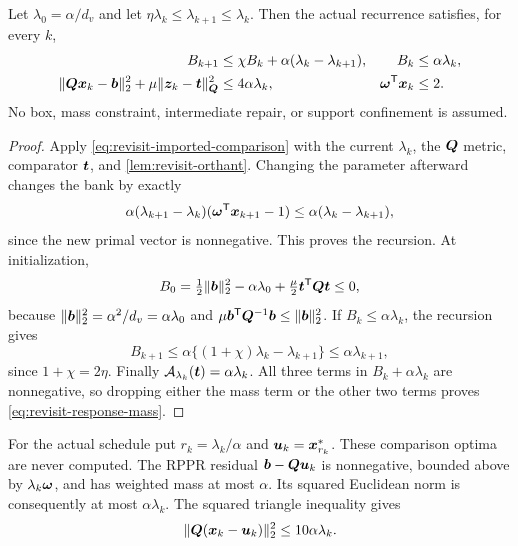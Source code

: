 \begin{theorem}
\label{thm:revisit-cooling-bank}
Let $\lambda_0=\alpha/d_v$ and let
$\eta\lambda_k\leq\lambda_{k+1}\leq\lambda_k$. Then the actual recurrence
satisfies, for every $k$,
\begin{align}
 B_{k+1}&\leq\chi B_k+\alpha(\lambda_k-\lambda_{k+1}),
                 &B_k&\leq\alpha\lambda_k,
                 \label{eq:revisit-cooling-bank}\\
 \|\bm{Q}\bm{x}_k-\bm{b}\|_2^2
   +\mu\|\bm{z}_k-\bm{t}\|_{\bm{Q}}^2&\leq4\alpha\lambda_k,
                 &\bm{\omega}^{\mathsf{T}}\bm{x}_k&\leq2.
                 \label{eq:revisit-response-mass}
\end{align}
No box, mass constraint, intermediate repair, or support confinement is
assumed.
\end{theorem}
\begin{proof}
Apply \cref{eq:revisit-imported-comparison} with the current $\lambda_k$,
the $\bm{Q}$ metric, comparator $\bm{t}$, and
\cref{lem:revisit-orthant}. Changing the parameter afterward changes the
bank by exactly
\[
 \alpha(\lambda_{k+1}-\lambda_k)
                     (\bm{\omega}^{\mathsf{T}}\bm{x}_{k+1}-1)
 \leq\alpha(\lambda_k-\lambda_{k+1}),
\]
since the new primal vector is nonnegative. This proves the recursion.
At initialization,
\[
 B_0=\tfrac12\|\bm{b}\|_2^2-\alpha\lambda_0
                                  +\tfrac\mu2\bm{t}^{\mathsf{T}}\bm{Q}\bm{t}\leq0,
\]
because $\|\bm{b}\|_2^2=\alpha^2/d_v=\alpha\lambda_0$ and
$\mu\bm{b}^{\mathsf{T}}\bm{Q}^{-1}\bm{b}\leq\|\bm{b}\|_2^2$.
If $B_k\leq\alpha\lambda_k$, the recursion gives
\[
 B_{k+1}\leq\alpha\{(1+\chi)\lambda_k-\lambda_{k+1}\}
              \leq\alpha\lambda_{k+1},
\]
since $1+\chi=2\eta$. Finally
$\mathcal A_{\lambda_k}(\bm{t})=\alpha\lambda_k$.
All three terms in $B_k+\alpha\lambda_k$ are nonnegative, so dropping
either the mass term or the other two terms proves
\cref{eq:revisit-response-mass}.
\end{proof}

For the actual schedule put $r_k=\lambda_k/\alpha$ and
$\bm{u}_k=\bm{x}_{r_k}^*$. These comparison optima are never computed.
The RPPR residual $\bm{b}-\bm{Q}\bm{u}_k$ is nonnegative, bounded above by
$\lambda_k\bm{\omega}$, and has weighted mass at most $\alpha$.
Its squared Euclidean norm is consequently at most $\alpha\lambda_k$.
The squared triangle inequality gives
\begin{equation}
 \|\bm{Q}(\bm{x}_k-\bm{u}_k)\|_2^2\leq10\alpha\lambda_k.
 \label{eq:revisit-optimum-response}
\end{equation}
